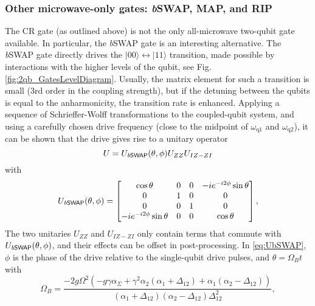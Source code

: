 \documentclass[aip,apr,twocolumn,showpacs,superscriptaddress,groupedaddress,nofootinbib,reprint]{revtex4-1}  %
\newcommand{\bSWAP}{\emph{b}\textsf{SWAP}}
\newcommand{\CR}{\textsf{CR}}
\begin{document}
\subsubsection{\label{sec:OtherUWaveGates}Other microwave-only gates: \textit{b}\textsf{SWAP}, \textsf{MAP}, and \textsf{RIP}}
The \CR{} gate (as outlined above) is not the only all-microwave two-qubit gate available. In particular, the \bSWAP{} gate\cite{Poletto2012} is an interesting alternative. The \bSWAP{} gate directly drives the $|00\rangle\leftrightarrow|11\rangle$ transition, made possible by interactions with the higher levels of the qubit, see Fig. \ref{fig:2qb_GatesLevelDiagram}. Usually, the matrix element for such a transition is small (3rd order in the coupling strength), but if the detuning between the qubits is equal to the anharmonicity, the transition rate is enhanced. Applying a sequence of Schrieffer-Wolff transformations to the coupled-qubit system, and using a carefully chosen drive frequency (close to the midpoint of $\omega_\text{q1}$ and $\omega_\text{q2}$), it can be shown\cite{Julich} that the drive gives rise to a unitary operator
\begin{equation}
U = U_{\bSWAP{}}(\theta,\phi)U_{ZZ}U_{IZ-ZI} \label{eq:Ub}
\end{equation}
with
\begin{equation}
U_{\bSWAP{}}(\theta,\phi) = \begin{bmatrix}
\cos \theta & 0 & 0 & -ie^{-i2\phi}\sin\theta\\
0 & 1 & 0 & 0\\
0 & 0 & 1 & 0\\
-ie^{-i2\phi}\sin\theta & 0 & 0 & \cos \theta\\
\end{bmatrix}, \label{eq:UbSWAP}
\end{equation}
The two unitaries $U_{ZZ}$ and $U_{IZ-ZI}$ only contain terms that commute with $U_{\bSWAP{}}(\theta,\phi)$, and their effects can be offset in post-processing\cite{Julich}. In \cref{eq:UbSWAP}, $\phi$ is the phase of the drive relative to the single-qubit drive pulses, and $\theta = \Omega_B t$ with
\begin{equation}
\Omega_B = \frac{-2g\Omega^2\left(-g \gamma \alpha_\Sigma+\gamma^2\alpha_2(\alpha_1+\Delta_{12}) + \alpha_1(\alpha_2-\Delta_{12})\right)}{(\alpha_1+\Delta_{12})(\alpha_2 -\Delta_{12})\Delta_{12}^2},
\end{equation}
\end{document}
